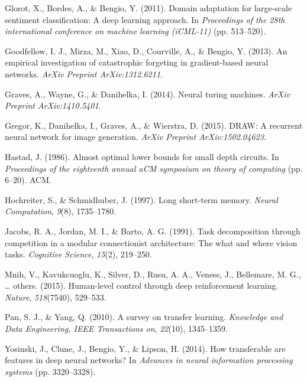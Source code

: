\documentclass[]{article}
\begin{document}
Glorot, X., Bordes, A., \& Bengio, Y. (2011). Domain adaptation for
large-scale sentiment classification: A deep learning approach. In
\emph{Proceedings of the 28th international conference on machine
learning (iCML-11)} (pp. 513--520).

Goodfellow, I. J., Mirza, M., Xiao, D., Courville, A., \& Bengio, Y.
(2013). An empirical investigation of catastrophic forgeting in
gradient-based neural networks. \emph{ArXiv Preprint ArXiv:1312.6211}.

Graves, A., Wayne, G., \& Danihelka, I. (2014). Neural turing machines.
\emph{ArXiv Preprint ArXiv:1410.5401}.

Gregor, K., Danihelka, I., Graves, A., \& Wierstra, D. (2015). DRAW: A
recurrent neural network for image generation. \emph{ArXiv Preprint
ArXiv:1502.04623}.

Hastad, J. (1986). Almost optimal lower bounds for small depth circuits.
In \emph{Proceedings of the eighteenth annual aCM symposium on theory of
computing} (pp. 6--20). ACM.

Hochreiter, S., \& Schmidhuber, J. (1997). Long short-term memory.
\emph{Neural Computation}, \emph{9}(8), 1735--1780.

Jacobs, R. A., Jordan, M. I., \& Barto, A. G. (1991). Task decomposition
through competition in a modular connectionist architecture: The what
and where vision tasks. \emph{Cognitive Science}, \emph{15}(2),
219--250.

Mnih, V., Kavukcuoglu, K., Silver, D., Rusu, A. A., Veness, J.,
Bellemare, M. G., \ldots{} others. (2015). Human-level control through
deep reinforcement learning. \emph{Nature}, \emph{518}(7540), 529--533.

Pan, S. J., \& Yang, Q. (2010). A survey on transfer learning.
\emph{Knowledge and Data Engineering, IEEE Transactions on},
\emph{22}(10), 1345--1359.

Yosinski, J., Clune, J., Bengio, Y., \& Lipson, H. (2014). How
transferable are features in deep neural networks? In \emph{Advances in
neural information processing systems} (pp. 3320--3328).
\end{document}
